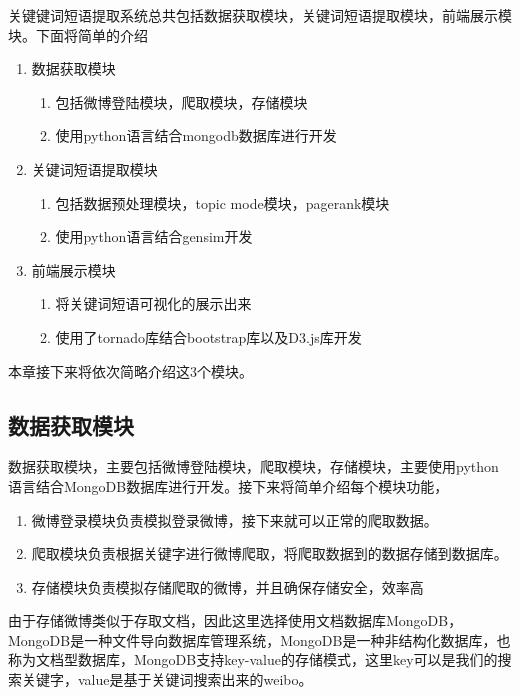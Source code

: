 \documentclass[master]{njuthesis}
\begin{document}
关键键词短语提取系统总共包括数据获取模块，关键词短语提取模块，前端展示模块。下面将简单的介绍
\begin{enumerate}
\item 数据获取模块
\begin{enumerate}
\item 包括微博登陆模块，爬取模块，存储模块
\item 使用python语言结合mongodb数据库进行开发
\end{enumerate}
\item 关键词短语提取模块
\begin{enumerate}
\item 包括数据预处理模块，topic mode模块，pagerank模块
\item 使用python语言结合gensim开发
\end{enumerate}
\item 前端展示模块
\begin{enumerate} 
\item 将关键词短语可视化的展示出来
\item 使用了tornado库结合bootstrap库以及D3.js库开发
\end{enumerate}
\end{enumerate}

本章接下来将依次简略介绍这3个模块。

\subsection{数据获取模块}
数据获取模块，主要包括微博登陆模块，爬取模块，存储模块，主要使用python语言结合MongoDB数据库进行开发。接下来将简单介绍每个模块功能，
\begin{enumerate}
\item 微博登录模块负责模拟登录微博，接下来就可以正常的爬取数据。
\item 爬取模块负责根据关键字进行微博爬取，将爬取数据到的数据存储到数据库。
\item 存储模块负责模拟存储爬取的微博，并且确保存储安全，效率高
\end{enumerate}

由于存储微博类似于存取文档，因此这里选择使用文档数据库MongoDB，MongoDB是一种文件导向数据库管理系统，MongoDB是一种非结构化数据库，也称为文档型数据库，MongoDB支持key-value的存储模式，这里key可以是我们的搜索关键字，value是基于关键词搜索出来的weibo。
\end{document}
